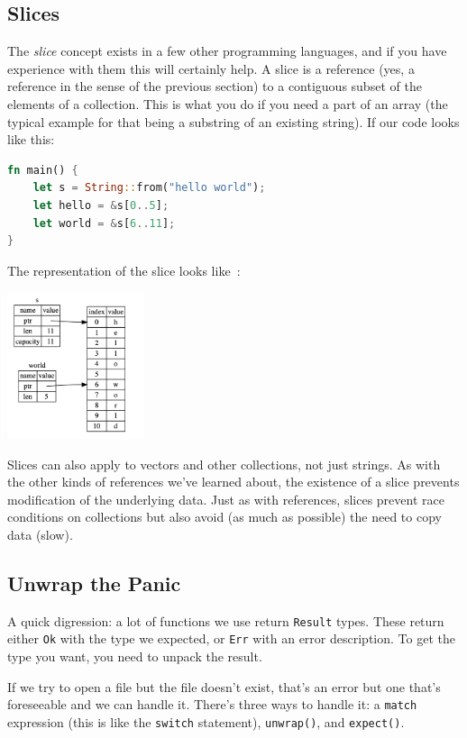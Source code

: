 \subsection*{Slices}
The \textit{slice} concept exists in a few other programming languages, and if you have experience with them this will certainly help. A slice is a reference (yes, a reference in the sense of the previous section) to a contiguous subset of the elements of a collection. This is what you do if you need a part of an array (the typical example for that being a substring of an existing string). If our code looks like this:

\begin{lstlisting}[language=Rust]
fn main() {
    let s = String::from("hello world");
    let hello = &s[0..5];
    let world = &s[6..11];
}
\end{lstlisting}

The representation of the slice looks like~\cite{rustdocs}:
\begin{center}
	\includegraphics[width=0.3\textwidth]{images/string-slice.png}
\end{center}

Slices can also apply to vectors and other collections, not just strings. As with the other kinds of references we've learned about, the existence of a slice prevents modification of the underlying data. Just as with references, slices prevent race conditions on collections but also avoid (as much as possible) the need to copy data (slow).

\subsection*{Unwrap the Panic}
A quick digression: a lot of functions we use return \texttt{Result} types. These return either \texttt{Ok} with the type we expected, or \texttt{Err} with an error description. To get the type you want, you need to unpack the result.

If we try to open a file but the file doesn't exist, that's an error but one that's foreseeable and we can handle it. There's three ways to handle it: a \texttt{match} expression (this is like the \texttt{switch} statement), \texttt{unwrap()}, and \texttt{expect()}. 

